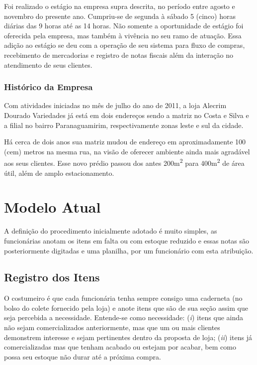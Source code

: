 \documentclass[
	draft,
	12pt,
	openright,
	oneside, %
	a4paper,
	chapter=TITLE,
	section=TITLE,
	english,
	brazil %
	]{abntex2-udesc}
\begin{document}
Foi realizado o estágio na empresa supra descrita, no período entre agosto e novembro do presente ano. Cumpriu-se de segunda à sábado 5 (cinco) horas diárias das 9 horas até as 14 horas. Não somente a oportunidade de estágio foi oferecida pela empresa, mas também à vivência no seu ramo de atuação. Essa adição ao estágio se deu com a operação de seu sistema para fluxo de compras, recebimento de mercadorias e registro de notas fiscais além da interação no atendimento de seus clientes.

\subsection{Histórico da Empresa}

Com atividades iniciadas no mês de julho do ano de 2011, a loja Alecrim Dourado Variedades já está em dois endereços sendo a matriz no Costa e Silva e a filial no bairro Paranaguamirim, respectivamente zonas leste e sul da cidade.

Há cerca de dois anos sua matriz mudou de endereço em aproximadamente 100 (cem) metros na mesma rua, na visão de oferecer ambiente ainda mais agradável aos seus clientes. Esse novo prédio passou dos antes 200m\textsuperscript{2} para 400m\textsuperscript{2} de área útil, além de amplo estacionamento.

\chapter{Modelo Atual}

A definição do procedimento inicialmente adotado é muito simples, as funcionárias anotam os itens em falta ou com estoque reduzido e essas notas são posteriormente digitadas e uma planilha, por um funcionário com esta atribuição.

\section{Registro dos Itens}

O costumeiro é que cada funcionária tenha sempre consigo uma caderneta (no bolso do colete fornecido pela loja) e anote itens que são de sua seção assim que seja percebida a necessidade. Entende-se como necessidade: (\textit{i}) itens que ainda não sejam comercializados anteriormente, mas que um ou mais clientes demonstrem interesse e sejam pertinentes dentro da proposta de loja; (\textit{ii}) itens já comercializadas mas que tenham acabado ou estejam por acabar, bem como possa seu estoque não durar até a próxima compra.
\end{document}
